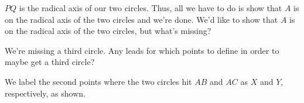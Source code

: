 



$PQ$ is the radical axis of our two circles.  Thus, all we have to do is show that $A$ is on the radical axis of the two circles and we're done. We'd like to show that $A$ is on the radical axis of the two circles, but what's missing?




We're missing a third circle. Any leads for which points to define in order to maybe get a third circle?



We label the second points where the two circles hit $AB$ and $AC$ as $X$ and $Y$, respectively, as shown.




